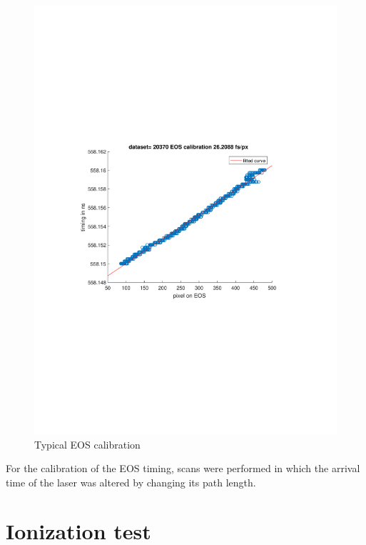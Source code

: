 \begin{figure}
\includegraphics[width=1.0\textwidth]{experiment/images/raw/20370_EOS_calibration.pdf}
\caption{Typical EOS calibration}
\label{img:EOS_Calib}
\end{figure}
For the calibration of the EOS timing, scans were performed in which the arrival time of the laser was altered by changing its
path length. 

\newpage
\section{Ionization test}

